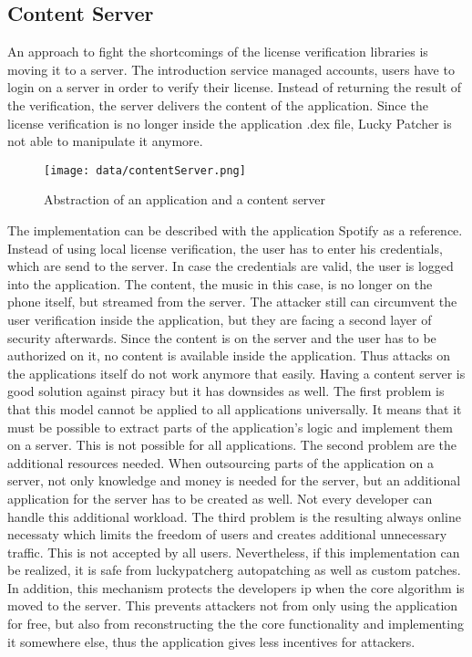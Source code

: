 \subsection{Content Server} \label{section:counter-replace-server}
An approach to fight the shortcomings of the license verification libraries is moving it to a server.
The introduction service managed accounts, users have to login on a server in order to verify their license.
Instead of returning the result of the verification, the server delivers the content of the application.
Since the license verification is no longer inside the application \gls{.dex} file, Lucky Patcher is not able to manipulate it anymore.
\newline
\begin{figure}[h]
    \centering
    \texttt{[image: data/contentServer.png]}
    \caption{Abstraction of an application and a content server}
    \label{fig:contentServer}
\end{figure}
The implementation can be described with the application Spotify \cite{spotify} as a reference.
Instead of using local license verification, the user has to enter his credentials, which are send to the server.
In case the credentials are valid, the user is logged into the application.
The content, the music in this case, is no longer on the phone itself, but streamed from the server.
The attacker still can circumvent the user verification inside the application, but they are facing a second layer of security afterwards.
Since the content is on the server and the user has to be authorized on it, no content is available inside the application.
Thus attacks on the applications itself do not work anymore that easily.
\newline
Having a content server is good solution against piracy but it has downsides as well.
The first problem is that this model cannot be applied to all applications universally.
It means that it must be possible to extract parts of the application's logic and implement them on a server.
This is not possible for all applications.
The second problem are the additional resources needed.
When outsourcing parts of the application on a server, not only knowledge and money is needed for the server, but an additional application for the server has to be created as well.
Not every developer can handle this additional workload.
The third problem is the resulting always online necessaty which limits the freedom of users and creates additional unnecessary traffic.
This is not accepted by all users.
\newline
Nevertheless, if this implementation can be realized, it is safe from \gls{luckypatcherg} autopatching as well as custom patches.
In addition, this mechanism protects the developers \gls{ip} when the core algorithm is moved to the server.
This prevents attackers not from only using the application for free, but also from reconstructing the the core functionality and implementing it somewhere else, thus the application gives less incentives for attackers.
